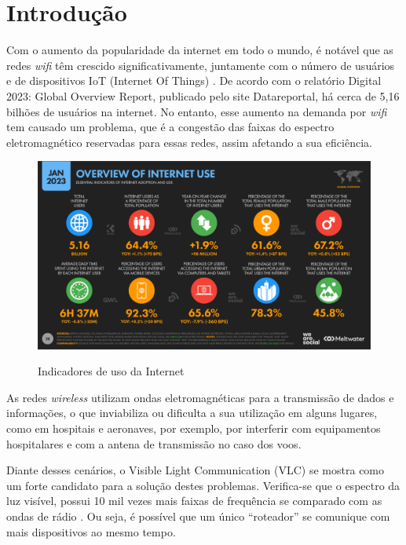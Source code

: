\chapter{Introdução}

Com o aumento da popularidade da internet em todo o mundo, é notável que as redes \textit{wifi} têm crescido significativamente, juntamente com o número de usuários e de dispositivos IoT (Internet Of Things) \cite{matheus2017comunicaccao}. De acordo com o relatório Digital 2023: Global Overview Report, publicado pelo site Datareportal, há cerca de 5,16 bilhões de usuários na internet. No entanto, esse aumento na demanda por \textit{wifi} tem causado um problema, que é a congestão das faixas do espectro eletromagnético reservadas para essas redes, assim afetando a sua eficiência.

\begin{figure}[!htbp]
  \caption{Indicadores de uso da Internet}
  \includegraphics[scale=0.4]{images/internet_use.png}
  \label{figura:usoInternet}
\end{figure}

As redes \textit{wireless} utilizam ondas eletromagnéticas para a transmissão de dados e informações, o que inviabiliza ou dificulta a sua utilização em alguns lugares, como em hospitais e aeronaves, por exemplo, por interferir com equipamentos hospitalares e com a antena de transmissão no caso dos voos.

Diante desses cenários, o Visible Light Communication (VLC) se mostra como um forte candidato para a solução destes problemas.
Verifica-se que o espectro da luz visível, possui 10 mil vezes mais faixas de frequência se comparado com as ondas de rádio \cite[p. 14]{conceiccao2015comunicaccao}.
Ou seja, é possível que um único ``roteador” se comunique com mais dispositivos ao mesmo tempo.

